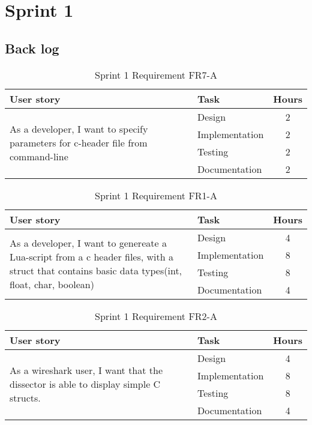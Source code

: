 \chapter{Sprint 1}

\section{Back log}
\begin{table}[ht] \small \center
\caption{Sprint 1 Requirement FR7-A}
\begin{tabular}{l l c}
	\toprule
	User story & Task & Hours \\
	\midrule
	\multirow{4}{5cm}{As a developer, I want to specify parameters for c-header file from command-line} & Design & 2 \\
	& Implementation & 2 \\
	& Testing & 2 \\
	& Documentation & 2 \\
	\bottomrule
\end{tabular}
\end{table}

\begin{table}[ht] \small \center
\caption{Sprint 1 Requirement FR1-A}
\begin{tabular}{l l c}
	\toprule
	User story & Task & Hours \\
	\midrule
	\multirow{4}{5cm}{ As a developer, I want to genereate a Lua-script from a c header files, with a struct that contains basic data types(int, float, char, boolean)} & Design & 4 \\
	& Implementation & 8 \\
	& Testing & 8 \\
	& Documentation & 4 \\
	\bottomrule
\end{tabular}
\end{table}

\begin{table}[ht] \small \center
\caption{Sprint 1 Requirement FR2-A}
\begin{tabular}{l l c}
	\toprule
	User story & Task & Hours \\
	\midrule
	\multirow{4}{5cm}{As a wireshark user, I want that the dissector is able to display simple C structs.} & Design & 4 \\
	& Implementation & 8 \\
	& Testing & 8 \\
	& Documentation & 4 \\
	\bottomrule
\end{tabular}
\end{table}


